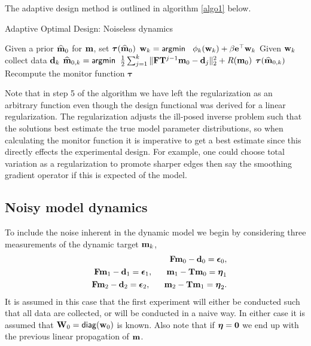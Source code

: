 \documentclass[11pt]{article}
\newcommand{\bfF}	{{\bf{F}}}
\newcommand{\bfI}	{{\bf{I}}}
\newcommand{\bfT}	{{\bf{T}}}
\newcommand{\bfW}	{{\bf{W}}}
\newcommand{\bfd}	{{\bf{d}}}
\newcommand{\bfe}	{{\bf{e}}}
\newcommand{\bfm}	{{\bf{m}}}
\newcommand{\bfw}	{{\bf{w}}}
\newcommand{\hf}        {{\frac 12}}
\newcommand{\bfepsilon} {{\boldsymbol \epsilon}}
\newcommand{\bfeta}     {{\boldsymbol \eta}}
\newcommand{\bftau}      {{\boldsymbol \tau}}
\newcommand {\zero}  { {\bf 0} }
\renewcommand{\hf}		 {\frac12}
\newcommand{\bfmhat}    {{\widehat{\bfm}}}
\begin{document}
\bigskip
The adaptive design method is outlined in  algorithm \ref{algo1} below.
\begin{algorithm}
\caption{Adaptive Optimal Design: Noiseless dynamics}\label{algo1}
\begin{algorithmic}[1]
\State Given a prior $\bfmhat_{0}$  for $\bfm$, set $\bftau(\bfmhat_0)$
\Comment{if there is no prior, $\bftau = \bfI$}
\State $\bfw_{k} = {\sf argmin }\;\;\ \phi_k(\bfw_k) + \beta\bfe^{\top}\bfw_k$  
\State Given $\bfw_k$ collect data $\bfd_k$
%
\State $\bfmhat_{0,k} ={\sf argmin } \;\; \hf  \sum_{j=1}^{k}\| \bfF\bfT^{j-1}\bfm_0 - \bfd_j \|^2_2 + R(\bfm_0)$
\Comment {re-estimate $\bfm_0$ }
\State $\bftau(\bfmhat_{0,k})$
\Comment Recompute the monitor function $\bftau$
\EndFor
\end{algorithmic}
\end{algorithm}
Note that in step 5 of the algorithm we have left the regularization as an arbitrary function even though the design functional was derived for a linear regularization. The regularization adjusts the ill-posed inverse problem such that the solutions best estimate the true model parameter distributions, so when calculating the monitor function it is imperative to get a best estimate since this directly effects the experimental design. For example, one could choose total variation as a regularization to promote sharper edges then say the smoothing gradient operator if this is expected of the model. 
\subsection{Noisy model dynamics}
\label{sec:Noisy}
To include the noise inherent in the dynamic model we begin by  considering three measurements of the dynamic target $\bfm_k$,
\begin{eqnarray*}
\label{eq:noisy}
&&\bfF\bfm_{0} - \bfd_0 = \bfepsilon_0,\\
&&\bfF\bfm_{1} - \bfd_1 = \bfepsilon_1, \;\;\;\;\;\; \bfm_1 -\bfT\bfm_0 = \bfeta_1 \\
&&\bfF\bfm_{2} - \bfd_2 = \bfepsilon_2, \;\;\;\;\;\; \bfm_2 -\bfT\bfm_1 = \bfeta_2.
\end{eqnarray*} 
It is assumed in this case that the first experiment will either be conducted such that all data are collected,  or will be conducted in a naive way. In either case it is assumed that $\bfW_0 = {\sf diag}(\bfw_0)$ is known. Also note that if $\bfeta = \zero$ we end up with the previous linear propagation of $\bfm$. 
\end{document}
